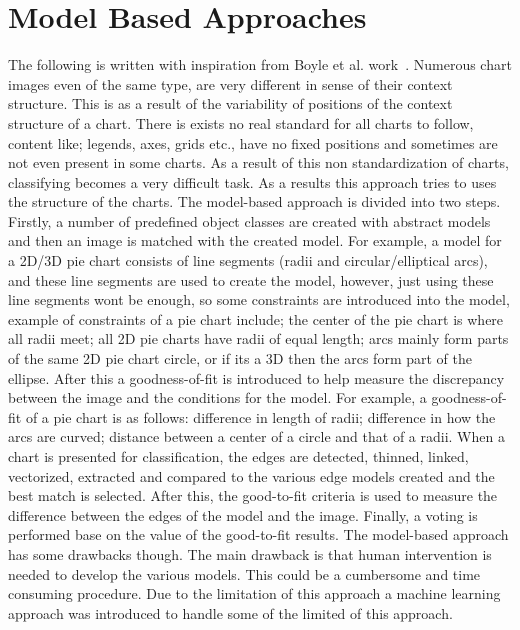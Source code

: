 \documentclass[12pt, a4paper,oneside]{report}
\begin{document}
\section{Model Based Approaches}
The following is written with inspiration from Boyle et al. work~\cite{boyle2007advances}. Numerous chart images even of the same type, are very different in sense of their context structure. This is as a result of the variability of positions of the context structure of a chart. There is exists no real standard for all charts to follow, content like; legends, axes, grids etc., have no fixed positions and sometimes are not even present in some charts. As a result of this non standardization of charts, classifying becomes a very difficult task. As a results this approach tries to uses the structure of the charts. The model-based approach is divided into two steps. Firstly, a number of predefined object classes are created with abstract models and then an image is matched with the created model. For example, a model for a 2D/3D pie chart consists of line segments (radii and circular/elliptical arcs), and these line segments are used to create the model, however, just using these line segments wont be enough, so some constraints are introduced into the model, example of constraints of a pie chart include; the center of the pie chart is where all radii meet; all 2D pie charts have radii of equal length; arcs mainly form parts of the same 2D pie chart circle, or if its a 3D then the arcs form part of the ellipse. After this a goodness-of-fit is introduced to help measure the discrepancy between the image and the conditions for the model. For example, a goodness-of-fit of a pie chart is as follows: difference in length of radii; difference in how the arcs are curved; distance between a center of a circle and that of a radii. When a chart is presented for classification, the edges are detected, thinned, linked, vectorized, extracted and compared to the various edge models created and the best match is selected. After this, the good-to-fit criteria is used to measure the difference between the edges of the model and the image. Finally, a voting is performed base on the value of the good-to-fit results. The model-based approach has some drawbacks though. The main drawback is that human intervention is needed to develop the various models. This could be a cumbersome and time consuming procedure. Due to the limitation of this approach a machine learning approach was introduced to handle some of the limited of this approach.
\end{document}
